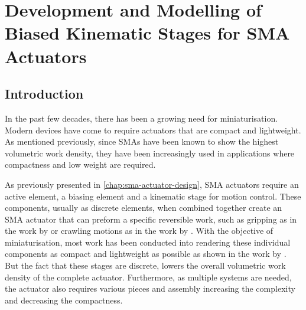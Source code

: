 
\chapter{Development and Modelling of Biased Kinematic Stages for SMA Actuators}\label{chap:design-methodology}


\section{Introduction}
In the past few decades, there has been a growing need for miniaturisation. Modern devices have come to require actuators that are compact and lightweight. As mentioned previously, since SMAs have been known to show the highest volumetric work density, they have been increasingly used in applications where compactness and low weight are required.

As previously presented in \cref{chap:sma-actuator-design}, SMA actuators require an active element, a biasing element and a kinematic stage for motion control. These components, usually as discrete elements, when combined together create an SMA actuator that can preform a specific reversible work, such as gripping as in the work by \cite{luNovelDesignParallel2019} or crawling motions as in the work by \cite{yukShapeMemoryAlloybased2011}. With the objective of miniaturisation, most work has been conducted into rendering these individual components as compact and lightweight as possible as shown in the work by \cite{nespoliHighPotentialShape2010}. But the fact that these stages are discrete, lowers the overall volumetric work density of the complete actuator. Furthermore, as multiple systems are needed, the actuator also requires various pieces and assembly increasing the complexity and decreasing the compactness.

